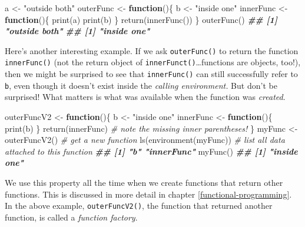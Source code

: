 \documentclass[
  12pt,
  krantz2]{krantz}
\makeatletter
\newenvironment{Shaded}{\begin{snugshade}}{\end{snugshade}}
\newcommand{\CommentTok}[1]{\textcolor[rgb]{0.37,0.37,0.37}{\textit{#1}}}
\newcommand{\ControlFlowTok}[1]{\textcolor[rgb]{0.27,0.27,0.27}{\textbf{#1}}}
\newcommand{\DocumentationTok}[1]{\textcolor[rgb]{0.37,0.37,0.37}{\textbf{\textit{#1}}}}
\newcommand{\FunctionTok}[1]{\textcolor[rgb]{0,0,0}{#1}}
\newcommand{\NormalTok}[1]{#1}
\newcommand{\OtherTok}[1]{\textcolor[rgb]{0.37,0.37,0.37}{#1}}
\newcommand{\StringTok}[1]{\textcolor[rgb]{0.5,0.5,0.5}{#1}}
\newenvironment{kframe}{%
\medskip{}
\setlength{\fboxsep}{.8em}
 \def\at@end@of@kframe{}%
 \ifinner\ifhmode%
  \def\at@end@of@kframe{\end{minipage}}%
  \begin{minipage}{\columnwidth}%
 \fi\fi%
 \def\FrameCommand##1{\hskip\@totalleftmargin \hskip-\fboxsep
 \colorbox{shadecolor}{##1}\hskip-\fboxsep
     \hskip-\linewidth \hskip-\@totalleftmargin \hskip\columnwidth}%
 \MakeFramed {\advance\hsize-\width
   \@totalleftmargin\z@ \linewidth\hsize
   \@setminipage}}%
 {\par\unskip\endMakeFramed%
 \at@end@of@kframe}
\renewenvironment{Shaded}{\begin{kframe}}{\end{kframe}}
\makeatother
\begin{document}
\begin{Shaded}
\begin{Highlighting}[]
\NormalTok{a }\OtherTok{\textless{}{-}} \StringTok{"outside both"}
\NormalTok{outerFunc }\OtherTok{\textless{}{-}} \ControlFlowTok{function}\NormalTok{()\{}
\NormalTok{  b }\OtherTok{\textless{}{-}} \StringTok{"inside one"}
\NormalTok{  innerFunc }\OtherTok{\textless{}{-}} \ControlFlowTok{function}\NormalTok{()\{}
    \FunctionTok{print}\NormalTok{(a) }
    \FunctionTok{print}\NormalTok{(b)}
\NormalTok{  \}}
  \FunctionTok{return}\NormalTok{(}\FunctionTok{innerFunc}\NormalTok{())}
\NormalTok{\}}
\FunctionTok{outerFunc}\NormalTok{()}
\DocumentationTok{\#\# [1] "outside both"}
\DocumentationTok{\#\# [1] "inside one"}
\end{Highlighting}
\end{Shaded}

Here's another interesting example. If we ask \texttt{outerFunc()} to return the function \texttt{innerFunc()} (not the return object of \texttt{innerFunct()}\ldots functions are objects, too!), then we might be surprised to see that \texttt{innerFunc()} can still successfully refer to \texttt{b}, even though it doesn't exist inside the \emph{calling environment.} But don't be surprised! What matters is what was available when the function was \emph{created}.

\begin{Shaded}
\begin{Highlighting}[]
\NormalTok{outerFuncV2 }\OtherTok{\textless{}{-}} \ControlFlowTok{function}\NormalTok{()\{}
\NormalTok{  b }\OtherTok{\textless{}{-}} \StringTok{"inside one"}
\NormalTok{  innerFunc }\OtherTok{\textless{}{-}} \ControlFlowTok{function}\NormalTok{()\{}
    \FunctionTok{print}\NormalTok{(b)}
\NormalTok{  \}}
  \FunctionTok{return}\NormalTok{(innerFunc) }\CommentTok{\# note the missing inner parentheses!}
\NormalTok{\}}
\NormalTok{myFunc }\OtherTok{\textless{}{-}} \FunctionTok{outerFuncV2}\NormalTok{() }\CommentTok{\# get a new function}
\FunctionTok{ls}\NormalTok{(}\FunctionTok{environment}\NormalTok{(myFunc)) }\CommentTok{\# list all data attached to this function}
\DocumentationTok{\#\# [1] "b"         "innerFunc"}
\FunctionTok{myFunc}\NormalTok{()}
\DocumentationTok{\#\# [1] "inside one"}
\end{Highlighting}
\end{Shaded}

We use this property all the time when we create functions that return other functions. This is discussed in more detail in chapter \ref{functional-programming}. In the above example, \texttt{outerFuncV2()}, the function that returned another function, is called a \emph{function factory}.
\end{document}
